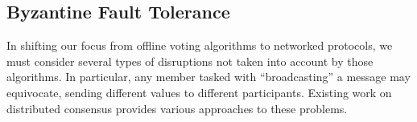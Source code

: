   \subsection{Byzantine Fault Tolerance}
    In shifting our focus from offline voting algorithms to networked protocols,
    we must consider several types of disruptions not taken into account by
    those algorithms. In particular, any member tasked with ``broadcasting'' a
    message may equivocate, sending different values to different participants.
    Existing work on distributed consensus provides various approaches to these
    problems.

